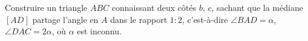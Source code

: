 Construire un triangle $ABC$ connaissant deux côtés $b$, $c$, sachant que la médiane $[AD]$ partage l'angle en $A$ dans le rapport $1 : 2$, c'est-à-dire $\angle BAD = \alpha$, $\angle DAC = 2\alpha$, où $\alpha$ est inconnu.
